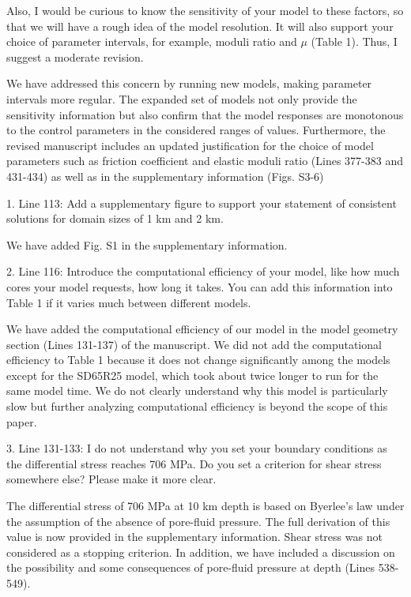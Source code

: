 \documentclass[12pt]{article}
\begin{document}
\begin{response}{Also, I would be curious to know the sensitivity of your model to these factors, so that we will have a rough idea of the model resolution. It will also support your choice of parameter intervals, for example, moduli ratio and $\mu$ (Table 1). Thus, I suggest a moderate revision.}

    We have addressed this concern by running new models, making parameter intervals more regular. The expanded set of models not only provide the sensitivity information but also confirm that the model responses are monotonous to the control parameters in the considered ranges of values. Furthermore, the revised manuscript includes an updated justification for the choice of model parameters such as friction coefficient and elastic moduli ratio (Lines 377-383 and 431-434) as well as  in the supplementary information (Figs. S3-6) 
\end{response}

\begin{response}{1. Line 113: Add a supplementary figure to support your statement of consistent solutions for domain sizes of 1 km and 2 km.}
  
We have added Fig. S1 in the supplementary information. 
    
\end{response}

\begin{response}{2. Line 116: Introduce the computational efficiency of your model, like how much cores your model requests, how long it takes. You can add this information into Table 1 if it varies much between different models.}

  We have added the computational efficiency of our model in the model geometry section (Lines 131-137) of the manuscript. We did not add the computational efficiency to Table 1 because it does not change significantly among the models except for the SD65R25 model, which took about twice longer to run for the same model time. We do not clearly understand why this model is particularly slow but further analyzing computational efficiency is beyond the scope of this paper.
  
\end{response}


\begin{response}{3. Line 131-133: I do not understand why you set your boundary conditions as the differential stress reaches 706 MPa. Do you set a criterion for shear stress somewhere else? Please make it more clear.}

  The differential stress of 706 MPa at 10 km depth is based on Byerlee's law under the assumption of the absence of pore-fluid pressure. The full derivation of this value is now provided in the supplementary information. Shear stress was not considered as a stopping criterion. In addition, we have included a discussion on the possibility and some consequences of pore-fluid pressure at depth (Lines 538-549).
  
\end{response}
\end{document}
